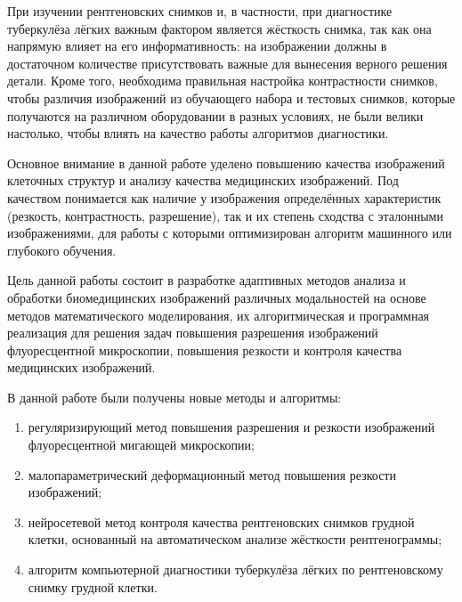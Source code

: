 При изучении рентгеновских снимков и, в частности, при диагностике туберкулёза лёгких важным фактором является жёсткость снимка, так как она напрямую влияет на его информативность: на изображении должны в достаточном количестве присутствовать важные для вынесения верного решения детали. Кроме того, необходима правильная настройка контрастности снимков, чтобы различия изображений из обучающего набора и тестовых снимков, которые получаются на различном оборудовании в разных условиях, не были велики настолько, чтобы влиять на качество работы алгоритмов диагностики.

Основное внимание в данной работе уделено повышению качества изображений клеточных структур и анализу качества медицинских изображений. Под качеством понимается как наличие у изображения определённых характеристик (резкость, контрастность, разрешение), так и их степень сходства с эталонными изображениями, для работы с которыми оптимизирован алгоритм машинного или глубокого обучения.


{\aim}

Цель данной работы состоит в разработке адаптивных методов анализа и обработки биомедицинских изображений различных модальностей на основе методов математического моделирования, их алгоритмическая и программная реализация для решения задач повышения разрешения изображений флуоресцентной микроскопии, повышения резкости и контроля качества медицинских изображений.


{\novelty}

В данной работе были получены новые методы и алгоритмы:

\begin{enumerate}[beginpenalty=10000]
 	\item регуляризирующий метод повышения разрешения и резкости изображений флуоресцентной мигающей микроскопии;

	\item малопараметрический деформационный метод повышения резкости изображений;

	\item нейросетевой метод контроля качества рентгеновских снимков грудной клетки, основанный на автоматическом анализе жёсткости рентгенограммы;
	
	\item алгоритм компьютерной диагностики туберкулёза лёгких по рентгеновскому снимку грудной клетки.
\end{enumerate}

